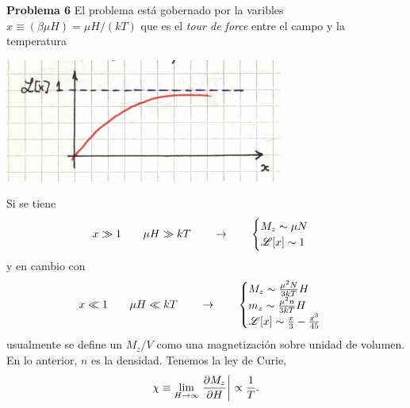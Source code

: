 \documentclass[10pt,oneside]{CBFT_book}
\begin{document}
\begin{ejemplo}{\bf Problema 6}
El problema está gobernado por la varibles $x \equiv (\beta \mu H) = \mu H / (k T)$ que es el {\it tour
de force} entre el campo y la temperatura

\includegraphics[scale=0.5]{images/1606329491.jpg}
 
Si se tiene 
\[
	x \gg 1 \qquad \mu H \gg k T \qquad \to \qquad 
	\begin{cases}
		M_z \sim \mu N \\
		\mathscr{L} [x] \sim 1
	\end{cases}
\]
y en cambio con
\[
	x \ll 1 \qquad \mu H \ll k T \qquad \to \qquad 
	\begin{cases}
		M_z \sim \frac{\mu^2 N}{3 k T} H \\
		m_z \sim \frac{\mu^2 n}{3 k T} H \\
		\mathscr{L} [x] \sim  \frac{x}{3} - \frac{x^3}{45}
	\end{cases}
\]
usualmente se define un $M_z/V$ como una magnetización sobre unidad de volumen. En lo anterior, $n$ es
la densidad.
Tenemos la ley de Curie,
\[
	\chi \equiv \lim_{H\to\infty} \left.\frac{\partial^{\hspace{-0.05em}} {M_z}}{\partial {H}^{\hspace{-0.05em}}}\right|_{} \propto \frac{1}{T}.
\]
 
\end{ejemplo}
\end{document}
